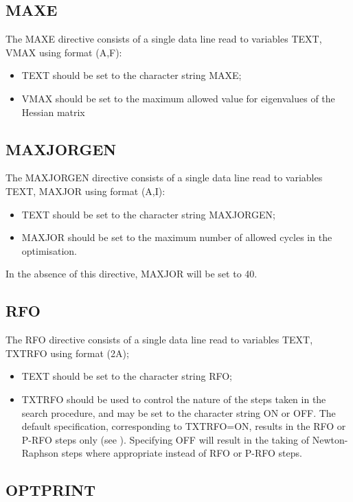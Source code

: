 \documentclass[11pt,fleqn]{article}
\begin{document}
\subsection{MAXE}

The MAXE directive consists of a single data line
read to variables TEXT, VMAX using format (A,F):
\begin{itemize}
\item TEXT should be set to the character string MAXE;
\item VMAX should be set to the
maximum allowed value for eigenvalues of the Hessian matrix
\end{itemize}

\subsection{MAXJORGEN}

The MAXJORGEN directive consists of a single data line
read to variables TEXT, MAXJOR using format (A,I):
\begin{itemize}
\item TEXT should be set to the character string MAXJORGEN;
\item MAXJOR should be set to the maximum number of 
allowed cycles in the optimisation.
\end{itemize}
In the absence of this directive, MAXJOR will be set to 40.

\subsection{RFO}

The RFO directive consists of a single data line
read to variables TEXT, TXTRFO using format (2A);
\begin{itemize}
\item TEXT should be set to the character string RFO;
\item TXTRFO should be used to control the nature
of the steps taken in the search procedure, and may be
set to the character string ON or OFF.
The default specification, corresponding to TXTRFO=ON, results
in the RFO or P-RFO steps only (see \cite{baker}).
Specifying OFF will
result in the taking of Newton-Raphson steps where appropriate 
instead of RFO or P-RFO steps.
\end{itemize}

\subsection{OPTPRINT}
\end{document}
